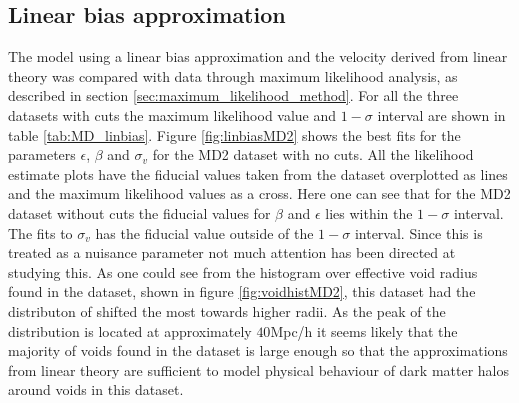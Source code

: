 \subsection{Linear bias approximation}
The model using a linear bias approximation and the velocity derived from linear theory was compared with data through maximum likelihood analysis, as described in section \ref{sec:maximum_likelihood_method}. For all the three datasets with cuts the maximum likelihood value and $1-\sigma$ interval are shown in table \ref{tab:MD_linbias}. Figure \ref{fig:linbiasMD2} shows the best fits for the parameters $\epsilon$, $\beta$ and $\sigma_v$ for the MD2 dataset with no cuts. All the likelihood estimate plots have the fiducial values taken from the dataset overplotted as lines and the maximum likelihood values as a cross. Here one can see that for the MD2 dataset without cuts the fiducial values for $\beta$ and $\epsilon$ lies within the $1-\sigma$ interval. The fits to $\sigma_v$ has the fiducial value outside of the $1-\sigma$ interval. Since this is treated as a nuisance parameter not much attention has been directed at studying this. As one could see from the histogram over effective void radius found in the dataset, shown in figure \ref{fig:voidhistMD2}, this dataset had the distributon of shifted the most towards higher radii. As the peak of the distribution is located at approximately $40$Mpc/h it seems likely that the majority of voids found in the dataset is large enough so that the approximations from linear theory are sufficient to model physical behaviour of dark matter halos around voids in this dataset.\\\indent
